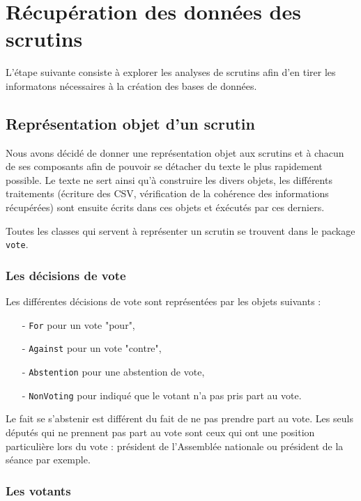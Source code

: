 \section{Récupération des données des scrutins}

L'étape suivante consiste à explorer les analyses de scrutins afin d'en tirer les informatons nécessaires à la création des bases de données.

\subsection{Représentation objet d'un scrutin}

Nous avons décidé de donner une représentation objet aux scrutins et à chacun de ses composants afin de pouvoir se détacher du texte le plus rapidement possible. Le texte ne sert ainsi qu'à construire les divers objets, les différents traitements (écriture des CSV, vérification de la cohérence des informations récupérées) sont ensuite écrits dans ces objets et éxécutés par ces derniers.

Toutes les classes qui servent à représenter un scrutin se trouvent dans le package \verb|vote|.

\subsubsection*{Les décisions de vote}

Les différentes décisions de vote sont représentées par les objets suivants :
\begin{itemize}
\item[-] \verb|For| pour un vote "pour",
\item[-] \verb|Against| pour un vote "contre",
\item[-] \verb|Abstention| pour une abstention de vote,
\item[-] \verb|NonVoting| pour indiqué que le votant n'a pas pris part au vote.
\end{itemize}

\vspace{0.3cm}
Le fait se s'abstenir est différent du fait de ne pas prendre part au vote. Les seuls députés qui ne prennent pas part au vote sont ceux qui ont une position particulière lors du vote : président de l'Assemblée nationale ou président de la séance par exemple.

\subsubsection*{Les votants}

